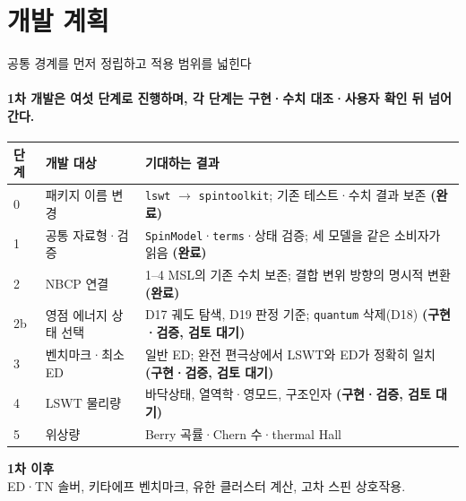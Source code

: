 \section[개발 계획]{개발 계획}

\begin{frame}[plain,label=section-plan]
  \sectionpage
\end{frame}

\begin{frame}[label=development-roadmap]{공통 경계를 먼저 정립하고 적용 범위를 넓힌다}
  \framesubtitle{1차 개발은 여섯 단계로 진행하며, 각 단계는 구현·수치 대조·사용자 확인 뒤 넘어간다.}
  \small
  \begin{tabularx}{\textwidth}{@{}p{0.8cm}p{3.3cm}Y@{}}
    \toprule
    단계 & 개발 대상 & 기대하는 결과 \\
     & 패키지 이름 변경 & \texttt{lswt} $\to$ \texttt{spintoolkit}; 기존 테스트·수치 결과 보존 \textbf{(완료)} \\
    1 & 공통 자료형·검증 & \texttt{SpinModel}·\texttt{terms}·상태 검증; 세 모델을 같은 소비자가 읽음 \textbf{(완료)} \\
    2 & NBCP 연결 & 1--4 MSL의 기존 수치 보존; 결합 변위 방향의 명시적 변환 \textbf{(완료)} \\
    2b & 영점 에너지 상태 선택 & D17 궤도 탐색, D19 판정 기준; \texttt{quantum} 삭제(D18) \textbf{(구현·검증, 검토 대기)} \\
    3 & 벤치마크·최소 ED & 일반 ED; 완전 편극상에서 LSWT와 ED가 정확히 일치 \textbf{(구현·검증, 검토 대기)} \\
    4 & LSWT 물리량 & 바닥상태, 열역학·영모드, 구조인자 \textbf{(구현·검증, 검토 대기)} \\
    5 & 위상량 & Berry 곡률·Chern 수·thermal Hall \\
    \bottomrule
  \end{tabularx}
  \par\medskip
  \textbf{1차 이후}\\[0.4em]
  ED·TN 솔버, 키타에프 벤치마크, 유한 클러스터 계산, 고차 스핀 상호작용.\\[0.4em]
\end{frame}

